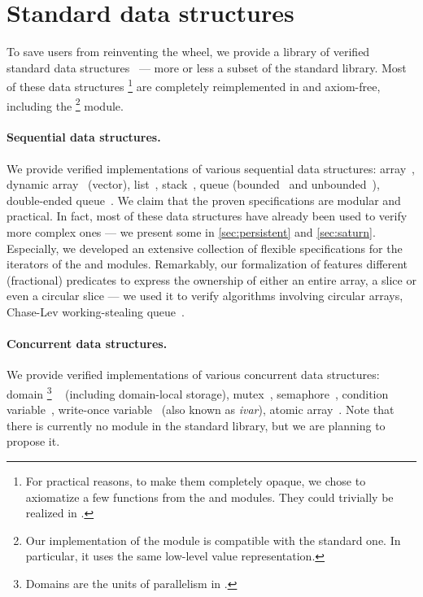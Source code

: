 \section{Standard data structures}
\label{sec:std}

To save users from reinventing the wheel, we provide a library of verified standard data structures~ --- more or less a subset of the \OCaml standard library.
Most of these data structures%
\footnote{
For practical reasons, to make them completely opaque, we chose to axiomatize a few functions from the  and  modules.
They could trivially be realized in \Zoo.
}
are completely reimplemented in \Zoo and axiom-free, including the %
\footnote{
Our implementation of the  module is compatible with the standard one.
In particular, it uses the same low-level value representation.
}
module.

\paragraph{Sequential data structures.}

We provide verified implementations of various sequential data structures: array~, dynamic array~ (vector), list~, stack~, queue (bounded~ and unbounded~), double-ended queue~.
We claim that the proven specifications are modular and practical.
In fact, most of these data structures have already been used to verify more complex ones --- we present some in \cref{sec:persistent} and \cref{sec:saturn}.
Especially, we developed an extensive collection of flexible specifications for the iterators of the  and  modules.
Remarkably, our formalization of  features different (fractional) predicates to express the ownership of either an entire array, a slice or even a circular slice --- we used it to verify algorithms involving circular arrays, \eg Chase-Lev working-stealing queue~\citep*{DBLP:conf/spaa/ChaseL05}.

\paragraph{Concurrent data structures.}

We provide verified implementations of various concurrent data structures: domain%
\footnote{
Domains are the units of parallelism in \OCamlFive.
}%
~
(including domain-local storage), mutex~, semaphore~, condition variable~, write-once variable~ (also known as \emph{ivar}), atomic array~.
Note that there is currently no  module in the \OCaml standard library, but we are planning to propose it.
